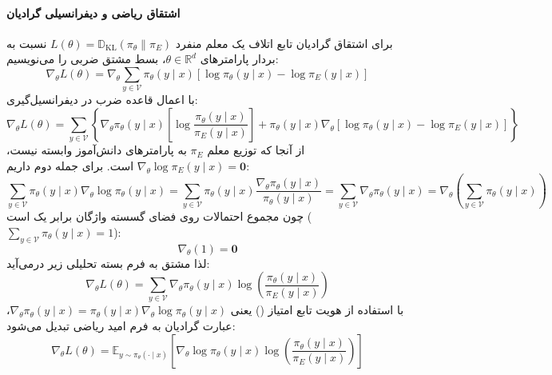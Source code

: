 \paragraph*{اشتقاق ریاضی و دیفرانسیلی گرادیان }
برای اشتقاق گرادیان تابع اتلاف یک معلم منفرد $L(\theta) = \mathbb{D}_{\text{KL}}(\pi_\theta \parallel \pi_E)$ نسبت به بردار پارامترهای $\theta \in \mathbb{R}^d$، بسط مشتق ضربی را می‌نویسیم:
\begin{equation}
    \nabla_\theta L(\theta) = \nabla_\theta \sum_{y \in \mathcal{V}} \pi_\theta(y \mid x) \left[ \log \pi_\theta(y \mid x) - \log \pi_E(y \mid x) \right]
\end{equation}
با اعمال قاعده ضرب در دیفرانسیل‌گیری:
\begin{equation}
    \nabla_\theta L(\theta) = \sum_{y \in \mathcal{V}} \left\{ \nabla_\theta \pi_\theta(y \mid x) \left[ \log \frac{\pi_\theta(y \mid x)}{\pi_E(y \mid x)} \right] + \pi_\theta(y \mid x) \nabla_\theta \left[ \log \pi_\theta(y \mid x) - \log \pi_E(y \mid x) \right] \right\}
\end{equation}
از آنجا که توزیع معلم $\pi_E$ به پارامترهای دانش‌آموز وابسته نیست، $\nabla_\theta \log \pi_E(y \mid x) = \mathbf{0}$ است. برای جمله دوم داریم:
\begin{equation}
    \sum_{y \in \mathcal{V}} \pi_\theta(y \mid x) \nabla_\theta \log \pi_\theta(y \mid x) = \sum_{y \in \mathcal{V}} \pi_\theta(y \mid x) \frac{\nabla_\theta \pi_\theta(y \mid x)}{\pi_\theta(y \mid x)} = \sum_{y \in \mathcal{V}} \nabla_\theta \pi_\theta(y \mid x) = \nabla_\theta \left( \sum_{y \in \mathcal{V}} \pi_\theta(y \mid x) \right)
\end{equation}
چون مجموع احتمالات روی فضای گسسته واژگان برابر یک است ($\sum_{y \in \mathcal{V}} \pi_\theta(y \mid x) = 1$):
\begin{equation}
    \nabla_\theta (1) = \mathbf{0}
\end{equation}
لذا مشتق به فرم بسته تحلیلی زیر درمی‌آید:
\begin{equation}
    \nabla_\theta L(\theta) = \sum_{y \in \mathcal{V}} \nabla_\theta \pi_\theta(y \mid x) \log \left( \frac{\pi_\theta(y \mid x)}{\pi_E(y \mid x)} \right)
\end{equation}
با استفاده از هویت تابع امتیاز () یعنی $\nabla_\theta \pi_\theta(y \mid x) = \pi_\theta(y \mid x) \nabla_\theta \log \pi_\theta(y \mid x)$، عبارت گرادیان به فرم امید ریاضی تبدیل می‌شود:
\begin{equation}
    \nabla_\theta L(\theta) = \mathbb{E}_{y \sim \pi_\theta(\cdot \mid x)} \left[ \nabla_\theta \log \pi_\theta(y \mid x) \log \left( \frac{\pi_\theta(y \mid x)}{\pi_E(y \mid x)} \right) \right]
\end{equation}

